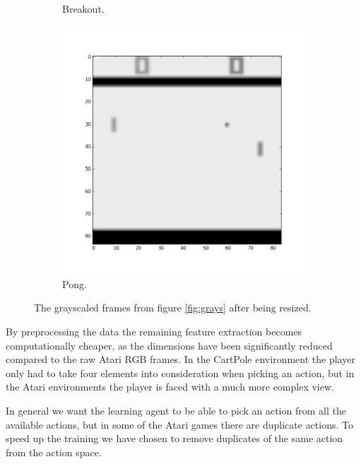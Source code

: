 \documentclass[11pt]{article}
\begin{document}
\begin{figure}[H]
\begin{subfigure}{.3\textwidth}
        \caption{Breakout.}
        \label{fig:scanlike}
    \end{subfigure}
    \begin{subfigure}{.3\textwidth}
        \centering
        \includegraphics[scale=0.23]{include/pong_1_gray_resized.png}
        \caption{Pong.}
        \label{fig:scan}
    \end{subfigure}
    \caption{The grayscaled frames from figure \ref{fig:grays} after being resized.}
     \label{fig:rez}
\end{figure}

By preprocessing the data the remaining feature extraction becomes computationally 
cheaper, as the dimensions have been significantly reduced compared to the raw Atari RGB frames.
In the CartPole environment the player only had to take four elements into consideration when picking an action,
but in the Atari environments the player is faced with a much more complex view. 

In general we want the learning agent to be able to pick an action from all
the available actions, but in some of the Atari games there are duplicate actions.
To speed up the training we have chosen to remove duplicates of the same action
from the action space.
\end{document}
